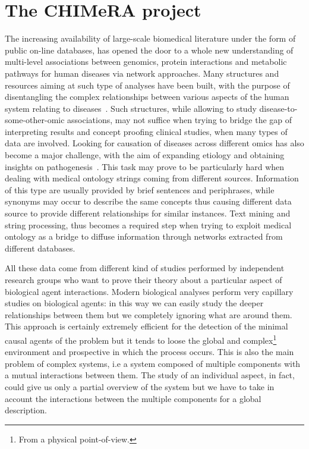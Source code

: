 \documentclass{standalone}
\begin{document}
\section[CHIMeRA]{The CHIMeRA project}\label{chimera:chimera}

The increasing availability of large-scale biomedical literature under the form of public on-line databases, has opened the door to a whole new understanding of multi-level associations between genomics, protein interactions and metabolic pathways for human diseases via network approaches.
Many structures and resources aiming at such type of analyses have been built, with the purpose of disentangling the complex relationships between various aspects of the human system relating to diseases~\cite{SymtomsNet, HumanPhenotype, chimerDB2017}.
Such structures, while allowing to study disease-to-some-other-omic associations, may not suffice when trying to bridge the gap of interpreting results and concept proofing clinical studies, when many types of data are involved.
Looking for causation of diseases across different omics has also become a major challenge, with the aim of expanding etiology and obtaining insights on pathogenesis~\cite{Barabasi2007}.
This task may prove to be particularly hard when dealing with medical ontology strings coming from different sources.
Information of this type are usually provided by brief sentences and periphrases, while synonyms may occur to describe the same concepts thus causing different data source to provide different relationships for similar instances.
Text mining and string processing, thus becomes a required step when trying to exploit medical ontology as a bridge to diffuse information through networks extracted from different databases.

All these data come from different kind of studies performed by independent research groups who want to prove their theory about a particular aspect of biological agent interactions.
Modern biological analyses perform very capillary studies on biological agents: in this way we can easily study the deeper relationships between them but we completely ignoring what are around them.
This approach is certainly extremely efficient for the detection of the minimal causal agents of the problem but it tends to loose the global and complex\footnote{
  From a physical point-of-view.
} environment and prospective in which the process occurs.
This is also the main problem of complex systems, i.e a system composed of multiple components with a mutual interactions between them.
The study of an individual aspect, in fact, could give us only a partial overview of the system but we have to take in account the interactions between the multiple components for a global description.
\end{document}
